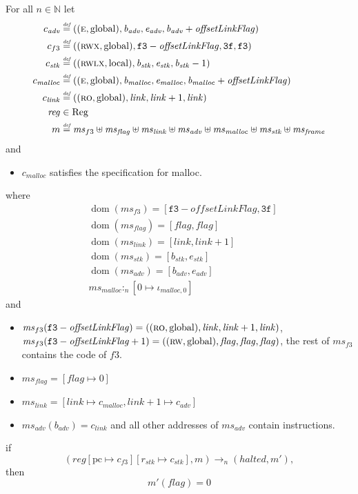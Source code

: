 \documentclass[format=acmsmall, review=true, screen=true]{acmart}
\newcommand{\update}[2]{[#1 \mapsto #2]}
\newcommand{\defeq}{\stackrel{\textit{\tiny{def}}}{=}}
\DeclareMathOperator{\dom}{dom}
\newcommand{\var}[1]{\mathit{#1}}
\newcommand{\hs}{\var{ms}}
\newcommand{\ms}{\hs}
\newcommand{\pcreg}{\mathrm{pc}}
\newcommand{\start}{\var{b}}
\newcommand{\addrend}{\var{e}}
\newcommand{\reg}{\var{reg}}
\newcommand{\heap}{\var{mem}}
\newcommand{\adv}{\var{adv}}
\newcommand{\link}{\var{link}}
\newcommand{\stk}{\var{stk}}
\newcommand{\flag}{\var{flag}}
\newcommand{\olf}{\var{offsetLinkFlag}}
\newcommand{\halted}{\mathit{halted}}
\newcommand{\heapSat}[3][\heap]{#1 :_{#2} #3}
\newcommand{\codelabel}[1]{\mathit{#1}}
\newcommand{\malloc}{\codelabel{malloc}}
\newcommand{\plaindom}[1]{\mathrm{#1}}
\newcommand{\Regs}{\plaindom{Reg}}
\newcommand{\nats}{\mathbb{N}}
\newcommand{\plainperm}[1]{\textsc{#1}}
\newcommand{\readonly}{\plainperm{ro}}
\newcommand{\readwrite}{\plainperm{rw}}
\newcommand{\entry}{\plainperm{e}}
\newcommand{\rwx}{\plainperm{rwx}}
\newcommand{\rwlx}{\plainperm{rwlx}}
\newcommand{\plainlocality}[1]{\mathrm{#1}}
\newcommand{\local}{\plainlocality{local}}
\newcommand{\glob}{\plainlocality{global}}
\newcommand{\step}[1][]{\rightarrow_{#1}}
\begin{document}
\begin{lemma}
  \label{lem:correctness-f3-detailed}
  For all $n \in \nats$
  let
  \begin{align*}
    c_{\var{adv}} & \defeq ((\entry,\glob),\start_{\adv},\addrend_{\adv},\start_{\adv}+\olf) \\
    c_{f3} & \defeq ((\rwx,\glob),\mathtt{f3}-\olf,\mathtt{3f},\mathtt{f3}) \\
    c_{\var{stk}} & \defeq ((\rwlx,\local),\start_\stk,\addrend_\stk,\start_\stk-1) \\
    c_\malloc & \defeq ((\entry,\glob),\start_\malloc,\addrend_\malloc,\start_\malloc+\olf) \\
    c_\link & \defeq ((\readonly,\glob),\link,\link+1,\link) \\
    \reg & \in \Regs \\
    m & \defeq \hs_{f3} \uplus 
        \hs_\flag \uplus                
        \ms_{\var{link}} \uplus 
        \hs_\adv \uplus 
        \ms_{\malloc} \uplus 
        \ms_{\var{stk}} \uplus
        \ms_{\var{frame}} 
  \end{align*}
  and
  \begin{itemize}
  \item $c_\malloc$ satisfies the specification for malloc.
  \end{itemize}
  where 
  \begin{align*}
    &\dom(\hs_{f3}) = [\mathtt{f3}-\olf,\mathtt{3f}] \\
    &\dom(\hs_\flag) = [\flag,\flag] \\
    &\dom(\ms_\link) = [\link,\link+1]\\
    &\dom(\ms_\stk) = [\start_\stk, \addrend_\stk]\\
    &\dom(\hs_{\adv}) = [\start_\adv,\addrend_\adv] \\
    &\heapSat[\hs_{\malloc}]{n}{[0 \mapsto \iota_{\malloc,0}]}
  \end{align*}
  and
  \begin{itemize}
  \item $\ms_{f3}(\mathtt{f3}-\olf) = ((\readonly,\glob),\link,\link+1,\link)$, $\ms_{f3}(\mathtt{f3}-\olf+1) = ((\readwrite,\glob),\flag,\flag,\flag)$, the rest of $\hs_{f3}$ contains the code of $f3$.
  \item $\ms_\flag = [\flag \mapsto 0]$
  \item $\ms_{\var{link}} = [\var{link} \mapsto c_\malloc, \var{link} + 1 \mapsto c_\adv]$
  \item $\hs_\adv(\start_\adv) = c_\link$ and all other addresses of $\ms_\adv$ contain instructions.
  \end{itemize}
  if 
  \[
    (\reg\update{\pcreg}{c_{f3}}\update{r_\stk}{c_\stk},m) \step[n] (\halted,m'),
  \]
  then
  \[
    m'(\flag) = 0
  \]  
\end{lemma}
\end{document}
